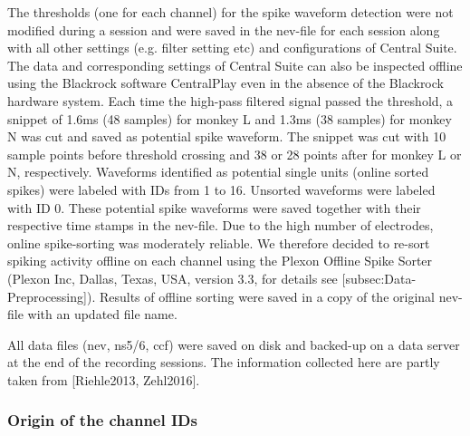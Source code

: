 The thresholds (one for each channel) for the spike waveform detection were not modified during a session and were saved in the nev-file for each session along with all other settings (e.g. filter setting etc) and configurations of Central Suite. The data and corresponding settings of Central Suite can also be inspected offline using the Blackrock software CentralPlay even in the absence of the Blackrock hardware system. Each time the high-pass filtered signal passed the threshold, a snippet of 1.6ms (48 samples) for monkey L and 1.3ms (38 samples) for monkey N was cut and saved as potential spike waveform. The snippet was cut with 10 sample points before threshold crossing and 38 or 28 points after for monkey L or N, respectively. Waveforms identified as potential single units (online sorted spikes) were labeled with IDs from 1 to 16. Unsorted waveforms were labeled with ID 0. These potential spike waveforms were saved together with their respective time stamps in the nev-file. Due to the high number of electrodes, online spike-sorting was moderately reliable. We therefore decided to re-sort spiking activity offline on each channel using the Plexon Offline Spike Sorter (Plexon Inc, Dallas, Texas, USA, version 3.3, for details see [subsec:Data-Preprocessing]). Results of offline sorting were saved in a copy of the original nev-file with an updated file name. 

All data files (nev, ns5/6, ccf) were saved on disk and backed-up on a data server at the end of the recording sessions. The information collected here are partly taken from [Riehle2013, Zehl2016].





\subsubsection{Origin of the channel IDs}

